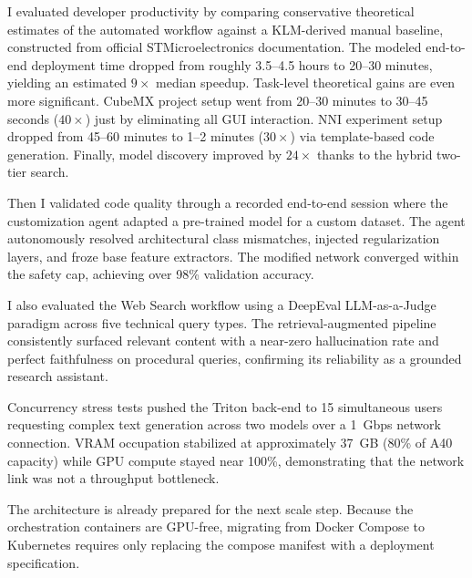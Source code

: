 \documentclass[11pt]{article}
\begin{document}
I evaluated developer productivity by comparing conservative theoretical estimates of the automated workflow against a KLM-derived manual baseline, constructed from official STMicroelectronics documentation. The modeled end-to-end deployment time dropped from roughly 3.5--4.5 hours to 20--30 minutes, yielding an estimated $9\times$ median speedup. Task-level theoretical gains are even more significant. CubeMX project setup went from 20--30 minutes to 30--45 seconds ($40\times$) just by eliminating all GUI interaction. NNI experiment setup dropped from 45--60 minutes to 1--2 minutes ($30\times$) via template-based code generation. Finally, model discovery improved by $24\times$ thanks to the hybrid two-tier search.

Then I validated code quality through a recorded end-to-end session where the customization agent adapted a pre-trained model for a custom dataset. The agent autonomously resolved architectural class mismatches, injected regularization layers, and froze base feature extractors. The modified network converged within the safety cap, achieving over 98\% validation accuracy.

I also evaluated the Web Search workflow using a DeepEval LLM-as-a-Judge paradigm across five technical query types. The retrieval-augmented pipeline consistently surfaced relevant content with a near-zero hallucination rate and perfect faithfulness on procedural queries, confirming its reliability as a grounded research assistant.

Concurrency stress tests pushed the Triton back-end to 15 simultaneous users requesting complex text generation across two models over a 1~Gbps network connection. VRAM occupation stabilized at approximately 37~GB (80\% of A40 capacity) while GPU compute stayed near 100\%, demonstrating that the network link was not a throughput bottleneck.

The architecture is already prepared for the next scale step. Because the orchestration containers are GPU-free, migrating from Docker Compose to Kubernetes requires only replacing the compose manifest with a deployment specification.
\end{document}
